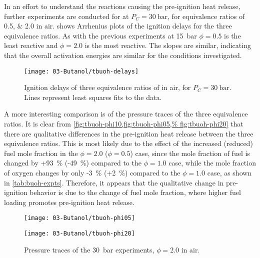 \documentclass[../main.tex]{subfiles}
\begin{document}
In an effort to understand the reactions causing the pre-ignition heat release,
further experiments are conducted for \tBuOH{} at $P_C=\SI{30}{\bar}$, for
equivalence ratios of \numlist{0.5;2.0} in air.  shows
Arrhenius plots of the ignition delays for the three equivalence ratios. As
with the previous \nBuOH{} experiments at \SI{15}{\bar} \cite{Weber2011}
$\phi=\num{0.5}$ is the least reactive and $\phi=\num{2.0}$ is the most reactive. The
slopes are similar, indicating that the overall activation energies are similar
for the conditions investigated.

\begin{figure}
    \texttt{[image: 03-Butanol/tbuoh-delays]}
    \caption{Ignition delays of three equivalence ratios of \tBuOH{}
    in air, for $P_C=\SI{30}{\bar}$. Lines represent least squares fits to the data.}
    \label{fig:tbuoh-delays}
\end{figure}

A more interesting comparison is of the pressure traces of the three
equivalence ratios. It is clear from \cref{fig:tbuoh-phi10,fig:tbuoh-phi05,%
fig:tbuoh-phi20} that there are qualitative differences in the pre-ignition
heat release between the three equivalence ratios. This is most likely
due to the effect of the increased (reduced) fuel mole fraction in the
$\phi=\num{2.0}$ ($\phi=\num{0.5}$) case, since the mole fraction of
fuel is changed by +\SI{93}{\percent} (-\SI{49}{\percent}) compared to the $\phi=\num{1.0}$ case, while the
mole fraction of oxygen changes by only -\SI{3}{\percent} (+\SI{2}{\percent}) compared to the $\phi=\num{1.0}$
case, as shown in \cref{tab:buoh-expts}. Therefore, it appears that the
qualitative change in pre-ignition behavior is due to the change of fuel mole
fraction, where higher fuel loading promotes pre-ignition heat release.

\begin{figure}
    \begin{floatrow}
    \ffigbox
        {\texttt{[image: 03-Butanol/tbuoh-phi05]}}
        {\caption{Pressure traces of the \SI{30}{\bar} \tBuOH{} experiments,
            $\phi=\num{0.5}$ in air.}
        \label{fig:tbuoh-phi05}}
    \ffigbox
        {\texttt{[image: 03-Butanol/tbuoh-phi20]}}
        {\caption{Pressure traces of the \SI{30}{\bar} \tBuOH{} experiments,
            $\phi=\num{2.0}$ in air.}
        \label{fig:tbuoh-phi20}}
    \end{floatrow}
\end{figure}
\end{document}
